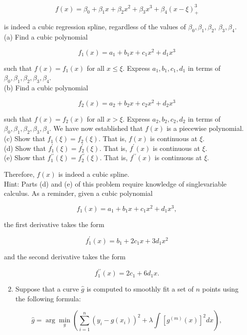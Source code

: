\documentclass[10pt]{article}
\begin{document}
$$
f(x)=\beta_{0}+\beta_{1} x+\beta_{2} x^{2}+\beta_{3} x^{3}+\beta_{4}(x-\xi)_{+}^{3}
$$

is indeed a cubic regression spline, regardless of the values of $\beta_{0}, \beta_{1}, \beta_{2}$, $\beta_{3}, \beta_{4}$.\\
(a) Find a cubic polynomial

$$
f_{1}(x)=a_{1}+b_{1} x+c_{1} x^{2}+d_{1} x^{3}
$$

such that $f(x)=f_{1}(x)$ for all $x \leq \xi$. Express $a_{1}, b_{1}, c_{1}, d_{1}$ in terms of $\beta_{0}, \beta_{1}, \beta_{2}, \beta_{3}, \beta_{4}$.\\
(b) Find a cubic polynomial

$$
f_{2}(x)=a_{2}+b_{2} x+c_{2} x^{2}+d_{2} x^{3}
$$

such that $f(x)=f_{2}(x)$ for all $x>\xi$. Express $a_{2}, b_{2}, c_{2}, d_{2}$ in terms of $\beta_{0}, \beta_{1}, \beta_{2}, \beta_{3}, \beta_{4}$. We have now established that $f(x)$ is a piecewise polynomial.\\
(c) Show that $f_{1}(\xi)=f_{2}(\xi)$. That is, $f(x)$ is continuous at $\xi$.\\
(d) Show that $f_{1}^{\prime}(\xi)=f_{2}^{\prime}(\xi)$. That is, $f^{\prime}(x)$ is continuous at $\xi$.\\
(e) Show that $f_{1}^{\prime \prime}(\xi)=f_{2}^{\prime \prime}(\xi)$. That is, $f^{\prime \prime}(x)$ is continuous at $\xi$.

Therefore, $f(x)$ is indeed a cubic spline.\\
Hint: Parts (d) and (e) of this problem require knowledge of singlevariable calculus. As a reminder, given a cubic polynomial

$$
f_{1}(x)=a_{1}+b_{1} x+c_{1} x^{2}+d_{1} x^{3},
$$

the first derivative takes the form

$$
f_{1}^{\prime}(x)=b_{1}+2 c_{1} x+3 d_{1} x^{2}
$$

and the second derivative takes the form

$$
f_{1}^{\prime \prime}(x)=2 c_{1}+6 d_{1} x .
$$

\begin{enumerate}
  \setcounter{enumi}{1}
  \item Suppose that a curve $\hat{g}$ is computed to smoothly fit a set of $n$ points using the following formula:
\end{enumerate}

$$
\hat{g}=\arg \min _{g}\left(\sum_{i=1}^{n}\left(y_{i}-g\left(x_{i}\right)\right)^{2}+\lambda \int\left[g^{(m)}(x)\right]^{2} d x\right),
$$
\end{document}
